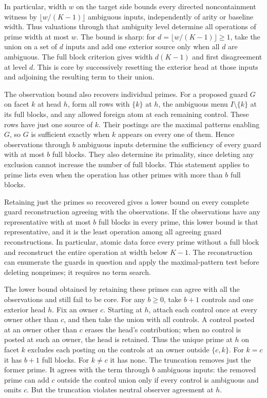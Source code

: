 In particular, width $w$ on the target side bounds every
directed noncontainment witness by $\lfloor w/(K-1)\rfloor$
ambiguous inputs, independently of arity or baseline width.
Thus valuations through that ambiguity level determine
all operations of prime width at most $w$. The bound is
sharp: for $d=\lfloor w/(K-1)\rfloor\ge1$, take the union
on a set of $d$ inputs and add one exterior source only
when all $d$ are ambiguous. The full block criterion gives
width $d(K-1)$ and first disagreement at level $d$. This
is core by successively resetting the exterior head at
those inputs and adjoining the resulting term to their union.

The observation bound also recovers individual primes.
For a proposed guard $G$ on facet $k$ at head $h$, form
all rows with $\{k\}$ at $h$, the ambiguous menu
$I\setminus\{k\}$ at its full blocks, and any allowed foreign
atom at each remaining control. These rows have just one
source of $k$. Their postings are the maximal patterns
enabling $G$, so $G$ is sufficient exactly when $k$ appears
on every one of them. Hence observations through $b$
ambiguous inputs determine the sufficiency of every guard
with at most $b$ full blocks. They also determine its
primality, since deleting any exclusion cannot increase
the number of full blocks. This statement applies to prime
lists even when the operation has other primes with more
than $b$ full blocks.

Retaining just the primes so recovered gives a lower bound
on every complete guard reconstruction agreeing with the
observations. If the observations have any representative
with at most $b$ full blocks in every prime, this lower bound
is that representative, and it is the least operation
among all agreeing guard reconstructions. In particular,
atomic data force every prime without a full block and
reconstruct the entire operation at width below $K-1$.
The reconstruction can enumerate the guards in question
and apply the maximal-pattern test before deleting
nonprimes; it requires no term search.

The lower bound obtained by retaining these primes can
agree with all the observations and still fail to be core.
For any $b\ge0$, take $b+1$ controls and one exterior
head $h$. Fix an owner $c$. Starting at $h$, attach each
control once at every owner other than $c$, and then take
the union with all controls. A control posted at an owner
other than $c$ erases the head's contribution; when no
control is posted at such an owner, the head is retained.
Thus the unique prime at $h$ on facet $k$ excludes each
posting on the controls at an owner outside $\{c,k\}$.
For $k=c$ it has $b+1$ full blocks. For $k\ne c$ it has none.
The truncation removes just the former prime. It agrees
with the term through $b$ ambiguous inputs: the removed
prime can add $c$ outside the control union only if every
control is ambiguous and omits $c$. But the truncation
violates neutral observer agreement at $h$.

